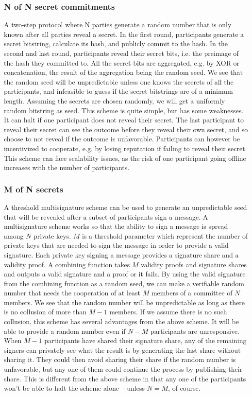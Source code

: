 \subsubsection{N of N  secret commitments}
A two-step protocol where N parties generate a random number that is only known after all parties reveal a secret.
In the first round, participants generate a secret bitstring, calculate its hash, and publicly commit to the hash. In the second and last round, participants reveal their secret bits, i.e. the preimage of the hash they committed to. All the secret bits are aggregated, e.g. by XOR or concatenation, the result of the aggregation being the random seed. We see that the random seed will be unpredictable unless one knows the secrets of all the participants, and infeasible to guess if the secret bitstrings are of a minimum length. Assuming the secrets are chosen randomly, we will get a uniformly random bitstring as seed.
This scheme is quite simple, but has some weaknesses. It can halt if one participant does not reveal their secret. The last participant to reveal their secret can see the outcome before they reveal their own secret, and so choose to not reveal if the outcome is unfavorable. Participants can however be incentivized to cooperate, e.g. by losing reputation if failing to reveal their secret. This scheme can face scalability issues, as the risk of one participant going offline increases with the number of participants.

\subsubsection{M of N secrets}
A threshold multisignature scheme can be used to generate an unpredictable seed that will be revealed after a subset of participants sign a message.
A multisignature scheme works so that the ability to sign a message is spread among $N$ private keys. $M$ is a threshold parameter which represent the number of private keys that are needed to sign the message in order to provide a valid signature. Each private key signing a message provides a signature share and a validity proof. A combining function takes $M$ validity proofs and signature shares and outputs a valid signature and a proof or it fails. By using the valid signature from the combining function as a random seed, we can make a verifiable random number that needs the cooperation of at least $M$ members of a committee of $N$ members.  
We see that the random number will be unpredictable as long as there is no collusion of more than $M-1$ members. If we assume there is no such collusion, this scheme has several advantages from the above scheme. It will be able to provide a random number even if $N-M$ participants are unresponsive. When $M-1$ participants have shared their signature share, any of the remaining signers can privately see what the result is by generating the last share without sharing it. They could then avoid sharing their share if the random number is unfavorable, but any one of them could continue the process by publishing their share. This is different from the above scheme in that any one of the participants won't be able to halt the scheme alone – unless $N=M$, of course.


